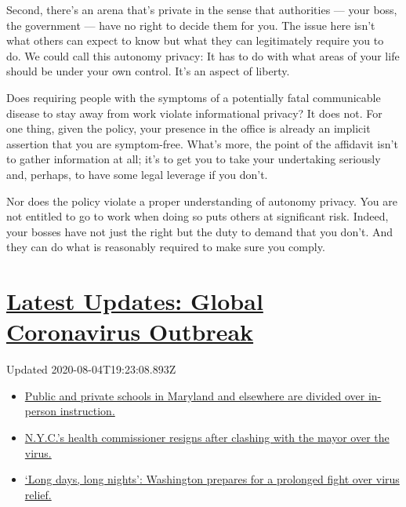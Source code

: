 Second, there's an arena that's private in the sense that authorities
--- your boss, the government --- have no right to decide them for you.
The issue here isn't what others can expect to know but what they can
legitimately require you to do. We could call this autonomy privacy: It
has to do with what areas of your life should be under your own control.
It's an aspect of liberty.

Does requiring people with the symptoms of a potentially fatal
communicable disease to stay away from work violate informational
privacy? It does not. For one thing, given the policy, your presence in
the office is already an implicit assertion that you are symptom-free.
What's more, the point of the affidavit isn't to gather information at
all; it's to get you to take your undertaking seriously and, perhaps, to
have some legal leverage if you don't.

Nor does the policy violate a proper understanding of autonomy privacy.
You are not entitled to go to work when doing so puts others at
significant risk. Indeed, your bosses have not just the right but the
duty to demand that you don't. And they can do what is reasonably
required to make sure you comply.

\hypertarget{latest-updates-global-coronavirus-outbreak}{%
\section{\texorpdfstring{\href{https://www.nytimes.com/2020/08/04/world/coronavirus-cases.html?action=click\&pgtype=Article\&state=default\&region=MAIN_CONTENT_1\&context=storylines_live_updates}{Latest
Updates: Global Coronavirus
Outbreak}}{Latest Updates: Global Coronavirus Outbreak}}\label{latest-updates-global-coronavirus-outbreak}}

Updated 2020-08-04T19:23:08.893Z

\begin{itemize}
\tightlist
\item
  \href{https://www.nytimes.com/2020/08/04/world/coronavirus-cases.html?action=click\&pgtype=Article\&state=default\&region=MAIN_CONTENT_1\&context=storylines_live_updates\#link-4825b93}{Public
  and private schools in Maryland and elsewhere are divided over
  in-person instruction.}
\item
  \href{https://www.nytimes.com/2020/08/04/world/coronavirus-cases.html?action=click\&pgtype=Article\&state=default\&region=MAIN_CONTENT_1\&context=storylines_live_updates\#link-4d1eafa8}{N.Y.C.'s
  health commissioner resigns after clashing with the mayor over the
  virus.}
\item
  \href{https://www.nytimes.com/2020/08/04/world/coronavirus-cases.html?action=click\&pgtype=Article\&state=default\&region=MAIN_CONTENT_1\&context=storylines_live_updates\#link-6b644638}{`Long
  days, long nights': Washington prepares for a prolonged fight over
  virus relief.}
\end{itemize}

